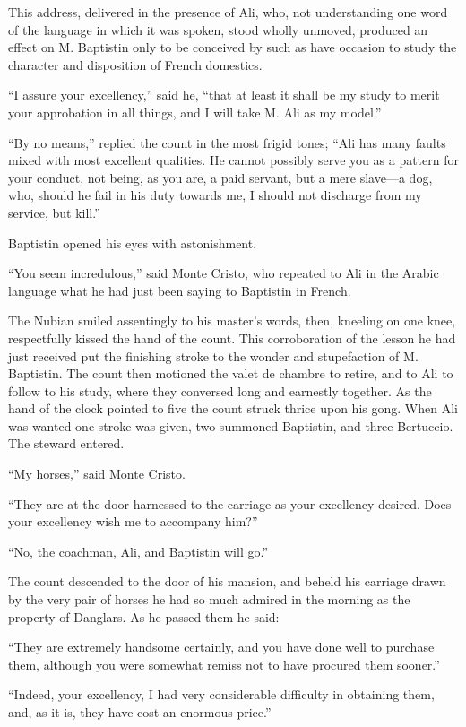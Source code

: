 This address, delivered in the presence of Ali, who, not understanding
one word of the language in which it was spoken, stood wholly unmoved,
produced an effect on M. Baptistin only to be conceived by such as have
occasion to study the character and disposition of French domestics.

“I assure your excellency,” said he, “that at least it shall be my
study to merit your approbation in all things, and I will take M. Ali
as my model.”

“By no means,” replied the count in the most frigid tones; “Ali has
many faults mixed with most excellent qualities. He cannot possibly
serve you as a pattern for your conduct, not being, as you are, a paid
servant, but a mere slave—a dog, who, should he fail in his duty
towards me, I should not discharge from my service, but kill.”

Baptistin opened his eyes with astonishment.

“You seem incredulous,” said Monte Cristo, who repeated to Ali in the
Arabic language what he had just been saying to Baptistin in French.

The Nubian smiled assentingly to his master’s words, then, kneeling on
one knee, respectfully kissed the hand of the count. This corroboration
of the lesson he had just received put the finishing stroke to the
wonder and stupefaction of M. Baptistin. The count then motioned the
valet de chambre to retire, and to Ali to follow to his study, where
they conversed long and earnestly together. As the hand of the clock
pointed to five the count struck thrice upon his gong. When Ali was
wanted one stroke was given, two summoned Baptistin, and three
Bertuccio. The steward entered.

“My horses,” said Monte Cristo.

“They are at the door harnessed to the carriage as your excellency
desired. Does your excellency wish me to accompany him?”

“No, the coachman, Ali, and Baptistin will go.”

The count descended to the door of his mansion, and beheld his carriage
drawn by the very pair of horses he had so much admired in the morning
as the property of Danglars. As he passed them he said:

“They are extremely handsome certainly, and you have done well to
purchase them, although you were somewhat remiss not to have procured
them sooner.”

“Indeed, your excellency, I had very considerable difficulty in
obtaining them, and, as it is, they have cost an enormous price.”

